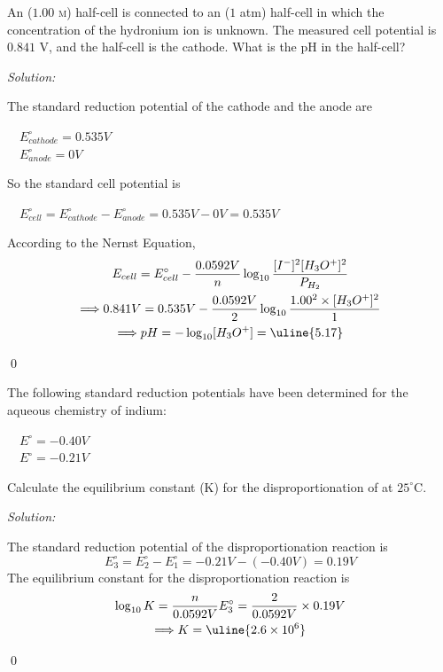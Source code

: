 \documentclass[12pt]{article}
\newenvironment{problem}[2][Problem]{\begin{trivlist}
\item[\hskip \labelsep {\bfseries #1}\hskip \labelsep {\bfseries #2.}]}{\end{trivlist}}
\newenvironment{sol}
    {\emph{Solution:}
    }
    {
    \qed
    }
\begin{document}
\begin{problem}{17.31}
An  ($1.00$ \textsc{m}) half-cell is connected to an  ($1$ atm) half-cell in which the concentration of the hydronium ion is unknown. The measured cell potential is $0.841$ V, and the  half-cell is the cathode. What is the pH in the  half-cell?
\end{problem}
\begin{sol}
The standard reduction potential of the cathode and the anode are
\begin{center}
~~$E_{cathode}^{\circ}=0.535V$\\
~~$E_{anode}^{\circ}=0V$
\end{center}
So the standard cell potential is
\begin{center}
~~$E_{cell}^{\circ}=E_{cathode}^{\circ}-E_{anode}^{\circ}=0.535V-0V=0.535V$
\end{center}
According to the Nernst Equation,
\begin{gather*}
E_{cell}=E_{cell}^{\circ}-\frac{0.0592V}{n}\log_{10}\frac{[I^-]^2[H_3O^+]^2}{P_{H_2}}\\
\Longrightarrow0.841V=0.535V-\frac{0.0592V}{2}\log_{10}\frac{1.00^2\times[H_3O^+]^2}{1}\\
\Longrightarrow pH=-\log_{10}[H_3O^+]=\uline{5.17}
\end{gather*}
\end{sol}

\begin{problem}{17.37}
The following standard reduction potentials have been determined for the aqueous chemistry of indium:
\begin{center}
~~$E^{\circ}=-0.40V$\\
~~$E^{\circ}=-0.21V$
\end{center}
Calculate the equilibrium constant (K) for the disproportionation of  at $25^{\circ}$C.
\begin{center}
\end{center}
\end{problem}
\begin{sol}
The standard reduction potential of the disproportionation reaction is
\[
E_3^{\circ}=E_2^{\circ}-E_1^{\circ}=-0.21V-(-0.40V)=0.19V
\]
The equilibrium constant for the disproportionation reaction is
\begin{gather*}
\log_{10}K=\frac{n}{0.0592V}E_3^{\circ}=\frac{2}{0.0592V}\times0.19V\\
\Longrightarrow K=\uline{2.6\times10^6}
\end{gather*}
\end{sol}
\end{document}
